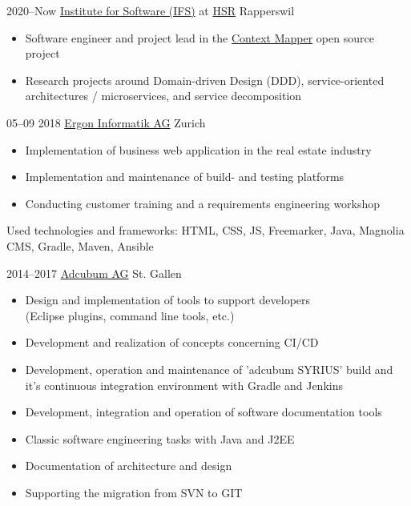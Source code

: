 \documentclass[]{cv-style}
\begin{document}
\begin{entrylist}
\entry
  {2020--Now}
  {\href{https://ifs.hsr.ch}{Institute for Software (IFS)} at \href{https://www.hsr.ch}{HSR}}
  {Rapperswil}
  {
  \begin{itemize}
  	\item Software engineer and project lead in the \href{https://contextmapper.org/}{Context Mapper} open source project
  	\item Research projects around Domain-driven Design (DDD), service-oriented architectures / microservices, and service decomposition
  \end{itemize}}
\entry
  {05--09 2018}
  {\href{https://www.ergon.ch}{Ergon Informatik AG}}
  {Zurich}
  {
  \begin{itemize}
  	\item Implementation of business web application in the real estate industry
  	\item Implementation and maintenance of build- and testing platforms
  	\item Conducting customer training and a requirements engineering workshop
  \end{itemize}
  Used technologies and frameworks: HTML, CSS, JS, Freemarker, Java, Magnolia CMS, Gradle, Maven, Ansible}
\entry
  {2014--2017}
  {\href{https://www.adcubum.com}{Adcubum AG}}
  {St. Gallen}
  {
  \begin{itemize}
    \item Design and implementation of tools to support developers \\(Eclipse plugins, command line tools, etc.)
    \item Development and realization of concepts concerning CI/CD
    \item Development, operation and maintenance of 'adcubum SYRIUS' build and it's continuous integration environment with Gradle and Jenkins
    \item Development, integration and operation of software documentation tools
    \item Classic software engineering tasks with Java and J2EE
    \item Documentation of architecture and design
    \item Supporting the migration from SVN to GIT

\end{itemize}}
\end{entrylist}
\end{document}
